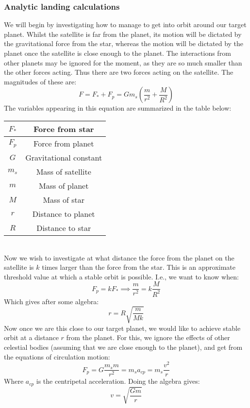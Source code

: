 \documentclass[a4paper,10pt,english]{article}
\begin{document}
\subsubsection{Analytic landing calculations}
We will begin by investigating how to manage to get into orbit around our target planet. Whilst the satellite is far from the planet, its motion will be dictated by the gravitational force from the star, whereas the motion will be dictated by the planet once the satellite is close enough to the planet. The interactions from other planets may be ignored for the moment, as they are so much smaller than the other forces acting. Thus there are two forces acting on the satellite. The magnitudes of these are:
$$F=F_*+F_p=Gm_s\left(\frac{m}{r^2}+\frac{M}{R^2}\right)$$
The variables appearing in this equation are summarized in the table below:\\
\begin{tabular}{|c|c|}
\hline
$F_*$ & Force from star\\
\hline
$F_p$ & Force from planet\\
\hline
$G$ & Gravitational constant\\
\hline
$m_s$ & Mass of satellite\\
\hline
$m$ & Mass of planet\\
\hline
$M$ & Mass of star\\
\hline
$r$ & Distance to planet\\
\hline
$R$ & Distance to star\\
\hline
\end{tabular}\\
Now we wish to investigate at what distance the force from the planet on the satellite is $k$ times larger than the force from the star. This is an approximate threshold value at which a stable orbit is possible. I.e., we want to know when:
$$F_p=kF_* \implies \frac{m}{r^2}=k\frac{M}{R^2}$$
Which gives after some algebra:
\begin{equation}\label{eq:soi_k}
r=R\sqrt{\frac{m}{Mk}}
\end{equation}
Now once we are this close to our target planet, we would like to achieve stable orbit at a distance $r$ from the planet. For this, we ignore the effects of other celestial bodies (assuming that we are close enough to the planet), and get from the equations of circulation motion:
$$F_p=G\frac{m_sm}{r^2}=m_s a_{cp}=m_s \frac{v^2}{r}$$
Where $a_{cp}$ is the centripetal acceleration. Doing the algebra gives:
\begin{equation}
v=\sqrt{\frac{Gm}{r}}
\end{equation}
\end{document}
